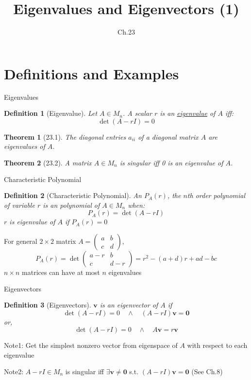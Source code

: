 \documentclass[final]{beamer}
\author[조남운]{\mail}
\title{Eigenvalues and Eigenvectors (1)}
\subtitle{Ch.23}
\newtheorem{defn}{Definition}
\newtheorem{thm}{Theorem}
\newcommand{\bd}{\mathbf}
\begin{document}
	
\maketitle


\section{Definitions and Examples} %
\label{sec:definitions_and_examples}
\begin{frame}[t]{Eigenvalues}
	\begin{defn}
		[Eigenvalue] Let $A\in M_n$. A scalar $r$ is an \uline{eigenvalue} of $A$ iff:
		\[
			\det(A-rI)=0
		\]
	\end{defn}
	\begin{thm}
		[23.1] The diagonal entries $a_{ii}$ of a diagonal matrix $A$ are eigenvalues of $A$.
	\end{thm}
	\begin{thm}
		[23.2] A matrix $A\in M_n$ is singular iff 0 is an eigenvalue of $A$. 
	\end{thm}
\end{frame}

\begin{frame}[t]{Characteristic Polynomial}
	\begin{defn}
		[Characteristic Polynomial] An $P_A(r)$, the $n$th order polynomial of variable $r$ is an polynomial of $A\in M_n$ when:\[
			P_A(r)=\det(A-rI) 
		\]
		$r$ is eigenvalue of $A$ if $P_A(r)=0$
	\end{defn}
	For general $2\times 2$ matrix $A = \begin{pmatrix}
		a & b\\c&d
	\end{pmatrix}$, 
	\[
		P_A(r) = \det \begin{pmatrix}
			a-r & b \\
			c & d-r
		\end{pmatrix} = r^2 - (a+d)r+ad-bc
	\]
	$n\times n$ matrices can have at most $n$ eigenvalues
\end{frame}
\begin{frame}[t]{Eigenvectors}
	\begin{defn}
		[Eigenvectors] $\bd{v}$ is an eigenvector of $A$ if \[
			\det(A-rI)=0 \quad \land \quad (A-rI)\bd{v}=\bd{0}
		\]or, \[
			\det(A-rI)=0 \quad \land \quad A\bd{v} = r\bd{v}
		\]
	\end{defn}
	Note1: Get the simplest nonzero vector from eigenspace of $A$ with respect to each eigenvalue
	 
	Note2: $A-rI\in M_n$ is singular iff $\exists \bd{v}\neq \bd{0}$  s.t. $(A-rI)\bd{v}=\bd{0}$ (See Ch.8)
\end{frame}
\end{document}
